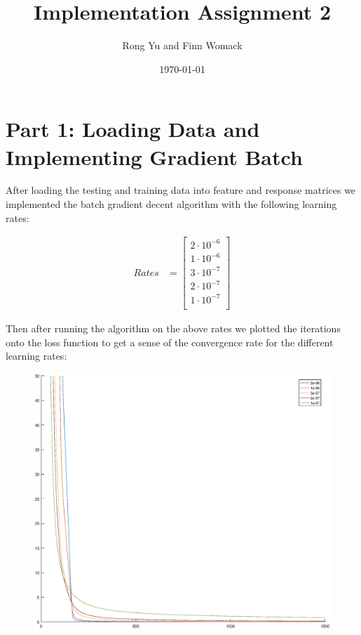 \documentclass{article}
\title{Implementation Assignment 2}
\date{\today}
\author{Rong Yu and Finn Womack}
\begin{document}
	\maketitle
	\section*{Part 1: Loading Data and Implementing Gradient Batch}
After loading the testing and training data into feature and response matrices we implemented the batch gradient decent algorithm with the following learning rates:
	
	\begin{align}
		Rates &= \begin{bmatrix}
			2 \cdot 10^{-6} \\
			1 \cdot 10^{-6} \\
			3 \cdot 10^{-7} \\
			2 \cdot 10^{-7} \\
			1 \cdot 10^{-7} \\
		\end{bmatrix}
	\end{align}
	
	Then after running the algorithm on the above rates we plotted the iterations onto the loss function to get a sense of the convergence rate for the different learning rates:
	
	\newpage
	
	\begin{figure}[h!]
		\begin{center} 
			\includegraphics[scale=0.5]{learn_rates.eps} 
		\end{center} 
		\label{fig:M1}
	\end{figure}
	
\end{document}
